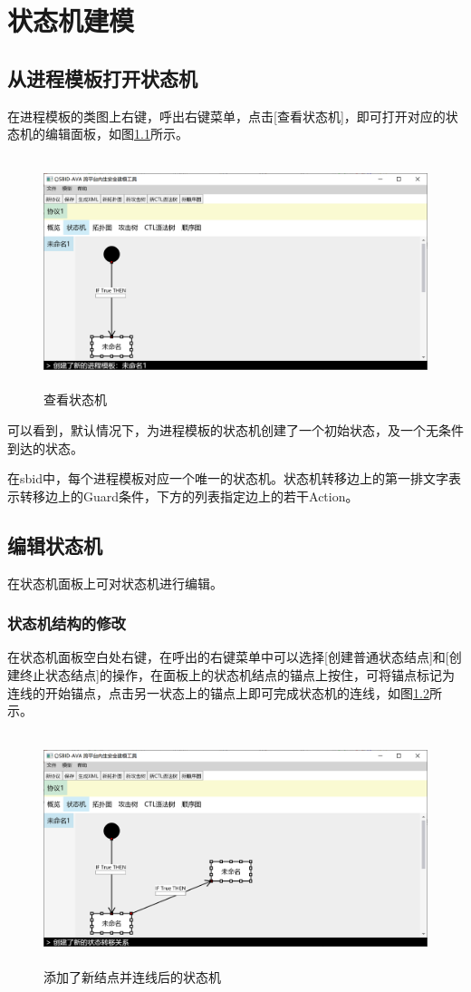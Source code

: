 \chapter{状态机建模}

\section{从进程模板打开状态机}
在进程模板的类图上右键，呼出右键菜单，点击[查看状态机]，即可打开对应的状态机的编辑面板，如图\ref{statemachine_panel}所示。
\begin{figure}[h]
	\centering
	\includegraphics[width=12cm,height=6.75cm]{imgs/statemachine_panel.png}
	\caption{查看状态机}
	\label{statemachine_panel}
\end{figure}
\par
可以看到，默认情况下，为进程模板的状态机创建了一个初始状态，及一个无条件到达的状态。
\par
在sbid中，每个进程模板对应一个唯一的状态机。状态机转移边上的第一排文字表示转移边上的Guard条件，下方的列表指定边上的若干Action。

\section{编辑状态机}
在状态机面板上可对状态机进行编辑。
\subsection{状态机结构的修改}
在状态机面板空白处右键，在呼出的右键菜单中可以选择[创建普通状态结点]和[创建终止状态结点]的操作，在面板上的状态机结点的锚点上按住，可将锚点标记为连线的开始锚点，点击另一状态上的锚点上即可完成状态机的连线，如图\ref{statemachine_edit_structure}所示。
\begin{figure}[h]
	\centering
	\includegraphics[width=12cm,height=6.75cm]{imgs/statemachine_edit_structure.png}
	\caption{添加了新结点并连线后的状态机}
	\label{statemachine_edit_structure}
\end{figure}
